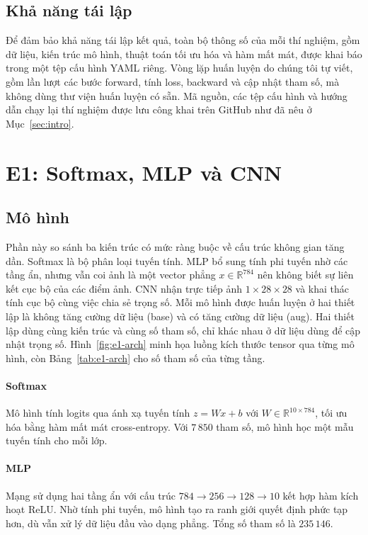 \documentclass[a4paper,12pt]{article}
\begin{document}
\subsection{Khả năng tái lập}
\label{sec:repro}

Để đảm bảo khả năng tái lập kết quả, toàn bộ thông số của mỗi thí nghiệm, gồm dữ liệu, kiến trúc mô hình, thuật toán tối ưu hóa và hàm mất mát, được khai báo trong một tệp cấu hình YAML riêng. Vòng lặp huấn luyện do chúng tôi tự viết, gồm lần lượt các bước forward, tính loss, backward và cập nhật tham số, mà không dùng thư viện huấn luyện có sẵn. Mã nguồn, các tệp cấu hình và hướng dẫn chạy lại thí nghiệm được lưu công khai trên GitHub như đã nêu ở Mục~\ref{sec:intro}.

\section{E1: Softmax, MLP và CNN}
\label{sec:e1}

\subsection{Mô hình}
\label{sec:e1-models}

Phần này so sánh ba kiến trúc có mức ràng buộc về cấu trúc không gian tăng dần. Softmax là bộ phân loại tuyến tính. MLP bổ sung tính phi tuyến nhờ các tầng ẩn, nhưng vẫn coi ảnh là một vector phẳng $x\in\mathbb{R}^{784}$ nên không biết sự liên kết cục bộ của các điểm ảnh. CNN nhận trực tiếp ảnh $1\times28\times28$ và khai thác tính cục bộ cùng việc chia sẻ trọng số. Mỗi mô hình được huấn luyện ở hai thiết lập là không tăng cường dữ liệu (base) và có tăng cường dữ liệu (aug). Hai thiết lập dùng cùng kiến trúc và cùng số tham số, chỉ khác nhau ở dữ liệu dùng để cập nhật trọng số. Hình~\ref{fig:e1-arch} minh họa luồng kích thước tensor qua từng mô hình, còn Bảng~\ref{tab:e1-arch} cho số tham số của từng tầng.

\paragraph{Softmax} Mô hình tính logits qua ánh xạ tuyến tính $z = Wx + b$ với $W\in\mathbb{R}^{10\times784}$, tối ưu hóa bằng hàm mất mát cross-entropy. Với $7\,850$ tham số, mô hình học một mẫu tuyến tính cho mỗi lớp.

\paragraph{MLP} Mạng sử dụng hai tầng ẩn với cấu trúc $784\to256\to128\to10$ kết hợp hàm kích hoạt ReLU. Nhờ tính phi tuyến, mô hình tạo ra ranh giới quyết định phức tạp hơn, dù vẫn xử lý dữ liệu đầu vào dạng phẳng. Tổng số tham số là $235\,146$.
\end{document}
